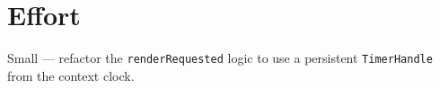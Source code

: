 \section{Effort}\label{record-379-effort}

Small --- refactor the \texttt{r\allowbreak{}e\allowbreak{}n\allowbreak{}d\allowbreak{}e\allowbreak{}r\allowbreak{}R\allowbreak{}e\allowbreak{}q\allowbreak{}u\allowbreak{}e\allowbreak{}s\allowbreak{}t\allowbreak{}e\allowbreak{}d} logic to use a persistent \texttt{T\allowbreak{}i\allowbreak{}m\allowbreak{}e\allowbreak{}r\allowbreak{}H\allowbreak{}a\allowbreak{}n\allowbreak{}d\allowbreak{}l\allowbreak{}e} from the context clock.

